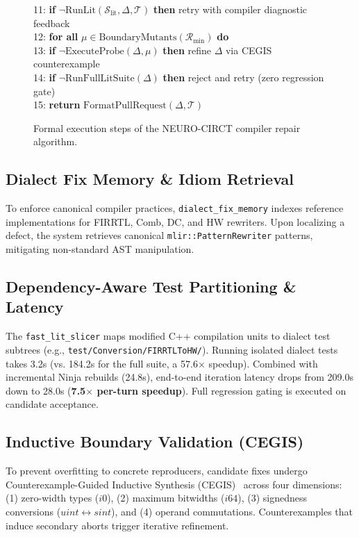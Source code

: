 \documentclass[conference]{IEEEtran}
\begin{document}
\begin{figure}[t]
{\begin{minipage}{0.94\columnwidth}
11: \textbf{if} $\neg \text{RunLit}(\mathcal{S}_{\text{lit}}, \Delta, \mathcal{T})$ \textbf{then} retry with compiler diagnostic feedback \\
12: \textbf{for all} $\mu \in \text{BoundaryMutants}(\mathcal{R}_{\text{min}})$ \textbf{do} \\
13: \quad \textbf{if} $\neg \text{ExecuteProbe}(\Delta, \mu)$ \textbf{then} refine $\Delta$ via CEGIS counterexample \\
14: \textbf{if} $\neg \text{RunFullLitSuite}(\Delta)$ \textbf{then} reject and retry (zero regression gate) \\
15: \textbf{return} $\text{FormatPullRequest}(\Delta, \mathcal{T})$
\end{minipage}
}
\caption{Formal execution steps of the NEURO-CIRCT compiler repair algorithm.}
\label{fig:algo}
\end{figure}

\subsection{Dialect Fix Memory \& Idiom Retrieval}
To enforce canonical compiler practices, \texttt{dialect\_fix\_memory} indexes reference implementations for FIRRTL, Comb, DC, and HW rewriters. Upon localizing a defect, the system retrieves canonical \texttt{mlir::PatternRewriter} patterns, mitigating non-standard AST manipulation.

\subsection{Dependency-Aware Test Partitioning \& Latency}
The \texttt{fast\_lit\_slicer} maps modified C++ compilation units to dialect test subtrees (e.g., \texttt{test/Conversion/FIRRTLToHW/}). Running isolated dialect tests takes 3.2s (vs. 184.2s for the full suite, a 57.6$\times$ speedup). Combined with incremental Ninja rebuilds (24.8s), end-to-end iteration latency drops from 209.0s down to 28.0s (\textbf{7.5$\times$ per-turn speedup}). Full regression gating is executed on candidate acceptance.

\subsection{Inductive Boundary Validation (CEGIS)}
To prevent overfitting to concrete reproducers, candidate fixes undergo Counterexample-Guided Inductive Synthesis (CEGIS)~\cite{solarlezama2006cegis} across four dimensions: (1) zero-width types ($i0$), (2) maximum bitwidths ($i64$), (3) signedness conversions ($uint \leftrightarrow sint$), and (4) operand commutations. Counterexamples that induce secondary aborts trigger iterative refinement.
\end{document}
